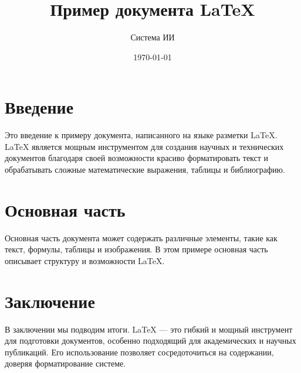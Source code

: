 \documentclass{article}
\title{Пример документа LaTeX}
\author{Система ИИ}
\date{\today}
\begin{document}
\maketitle

\section{Введение}
Это введение к примеру документа, написанного на языке разметки LaTeX. LaTeX является мощным инструментом для создания научных и технических документов благодаря своей возможности красиво форматировать текст и обрабатывать сложные математические выражения, таблицы и библиографию.

\section{Основная часть}
Основная часть документа может содержать различные элементы, такие как текст, формулы, таблицы и изображения. В этом примере основная часть описывает структуру и возможности LaTeX.

\section{Заключение}
В заключении мы подводим итоги. LaTeX — это гибкий и мощный инструмент для подготовки документов, особенно подходящий для академических и научных публикаций. Его использование позволяет сосредоточиться на содержании, доверяя форматирование системе.
\end{document}
